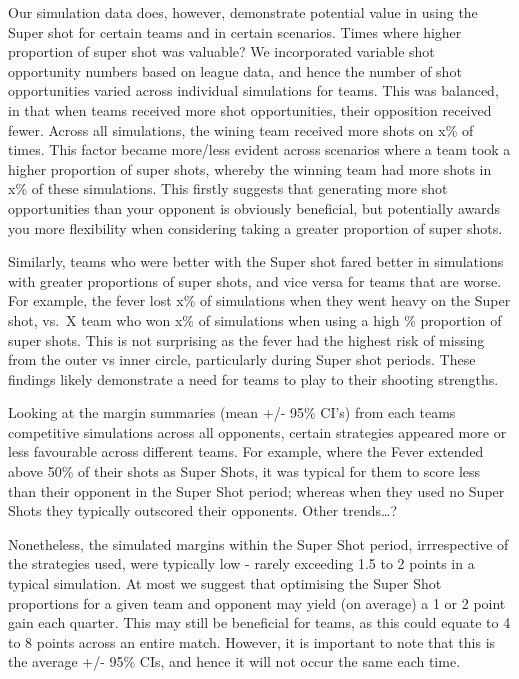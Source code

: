 \documentclass[]{elsarticle} %
\begin{document}
Our simulation data does, however, demonstrate potential value in using
the Super shot for certain teams and in certain scenarios. Times where
higher proportion of super shot was valuable? We incorporated variable
shot opportunity numbers based on league data, and hence the number of
shot opportunities varied across individual simulations for teams. This
was balanced, in that when teams received more shot opportunities, their
opposition received fewer. Across all simulations, the wining team
received more shots on x\% of times. This factor became more/less
evident across scenarios where a team took a higher proportion of super
shots, whereby the winning team had more shots in x\% of these
simulations. This firstly suggests that generating more shot
opportunities than your opponent is obviously beneficial, but
potentially awards you more flexibility when considering taking a
greater proportion of super shots.

Similarly, teams who were better with the Super shot fared better in
simulations with greater proportions of super shots, and vice versa for
teams that are worse. For example, the fever lost x\% of simulations
when they went heavy on the Super shot, vs.~X team who won x\% of
simulations when using a high \% proportion of super shots. This is not
surprising as the fever had the highest risk of missing from the outer
vs inner circle, particularly during Super shot periods. These findings
likely demonstrate a need for teams to play to their shooting strengths.

Looking at the margin summaries (mean +/- 95\% CI's) from each teams
competitive simulations across all opponents, certain strategies
appeared more or less favourable across different teams. For example,
where the Fever extended above 50\% of their shots as Super Shots, it
was typical for them to score less than their opponent in the Super Shot
period; whereas when they used no Super Shots they typically outscored
their opponents. Other trends\ldots?

Nonetheless, the simulated margins within the Super Shot period,
irrrespective of the strategies used, were typically low - rarely
exceeding 1.5 to 2 points in a typical simulation. At most we suggest
that optimising the Super Shot proportions for a given team and opponent
may yield (on average) a 1 or 2 point gain each quarter. This may still
be beneficial for teams, as this could equate to 4 to 8 points across an
entire match. However, it is important to note that this is the average
+/- 95\% CIs, and hence it will not occur the same each time.
\end{document}
